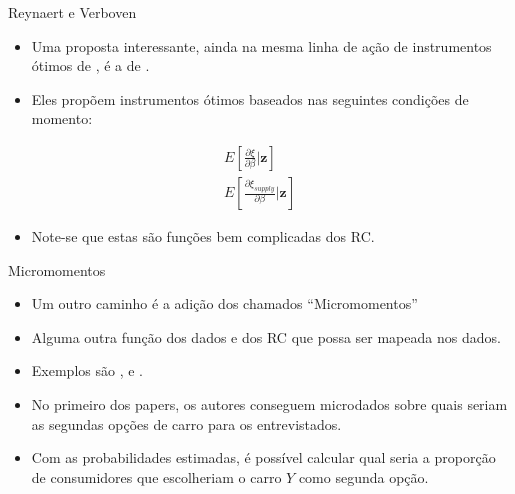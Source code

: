 \documentclass{beamer}
\begin{document}
\begin{frame}{Reynaert e Verboven}
\begin{itemize}
    \item Uma proposta interessante, ainda na mesma linha de ação de instrumentos ótimos de \citet{Chamberlain1987}, é a de \citet{Reynaert2014a}.
    \item Eles propõem instrumentos ótimos baseados nas seguintes condições de momento:
    
\end{itemize}
    \begin{align*}
        E\left[\frac{\partial \xi}{\partial \beta} | \mathbf{z} \right] \\
        E\left[\frac{\partial \xi_{supply}}{\partial \beta} | \mathbf{z} \right]
    \end{align*}
\begin{itemize}
    \item Note-se que estas são funções bem complicadas dos RC.
\end{itemize}
    
\end{frame}

\begin{frame}{Micromomentos}
\begin{itemize}
    \item Um outro caminho é a adição dos chamados ``Micromomentos''
    \item Alguma outra função dos dados e dos RC que possa ser mapeada nos dados.
    \item Exemplos são \citet{Berry2004}, e \citet{Petrin2002}.
    \item No primeiro dos papers, os autores conseguem microdados sobre quais seriam as segundas opções de carro para os entrevistados.
    \item Com as probabilidades estimadas, é possível calcular qual seria a proporção de consumidores que escolheriam o carro $Y$ como segunda opção.
\end{itemize}
    
\end{frame}



\begin{frame}[allowframebreaks]



\end{frame}


\end{document}
